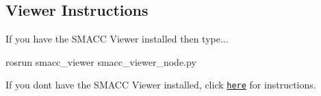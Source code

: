 \subsection*{Viewer Instructions}

If you have the S\+M\+A\+CC Viewer installed then type...


\begin{DoxyCode}
rosrun smacc\_viewer smacc\_viewer\_node.py
\end{DoxyCode}


If you don\textquotesingle{}t have the S\+M\+A\+CC Viewer installed, click \href{http://smacc.ninja/smacc-viewer/}{\tt here} for instructions. 